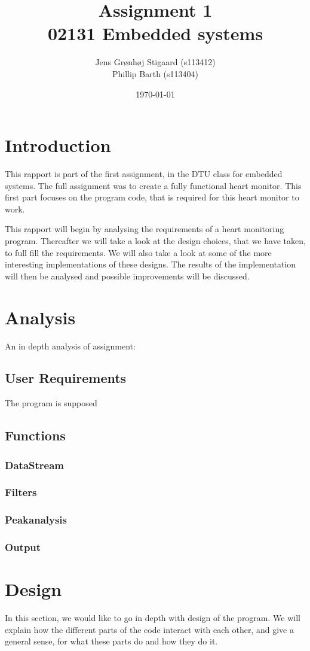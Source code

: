 \documentclass[12pt, danish, a4paper, titlepage]{article}
\title{{\huge Assignment 1}\\02131 Embedded systems}
\author{
		Jens Grønhøj Stigaard 	(s113412)\\
		Phillip Barth 		(s113404)
}
\date{\small \today}
\begin{document}
	\maketitle	
	
	\tableofcontents
	\newpage	
	
	\section{Introduction}
	This rapport is part of the first assignment, in the DTU class for embedded systems.
	The full assignment was to create a fully functional heart monitor. This first part focuses on the program code, that is required for this heart monitor to work.
	
	\noindent This rapport will begin by analysing the requirements of a heart monitoring program. Thereafter we will take a look at the design choices, that we have taken, to full fill the requirements. 
	We will also take a look at some of the more interesting implementations of these designs.
	The results of the implementation will then be analysed and possible improvements will be discussed. 
	\newpage
	\section{Analysis}
	An in depth analysis of assignment:
		\subsection{User Requirements}
		The program is supposed  
		\subsection{Functions}
			\subsubsection{DataStream}
			\subsubsection{Filters}
			\subsubsection{Peakanalysis}
			\subsubsection{Output}
			
	\section{Design}
	In this section, we would like to go in depth with design of the program. We will explain how the different parts of the code interact with each other, and give a general sense, for what these parts do and how they do it.
\end{document}
